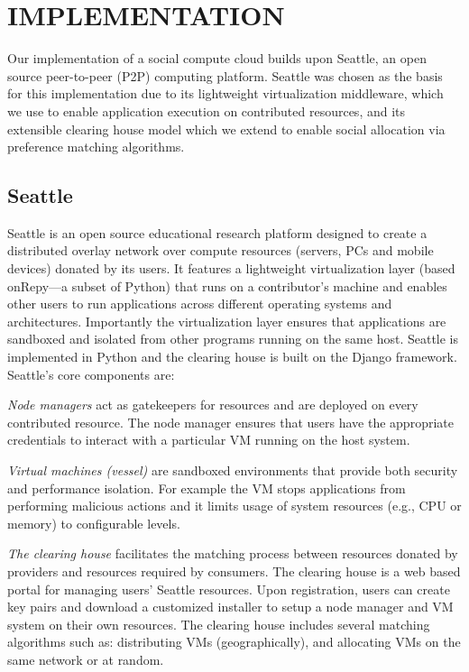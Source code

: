 \documentclass[a4paper,12pt]{article}
\begin{document}
	\section{IMPLEMENTATION}
Our implementation of a social compute cloud builds upon
Seattle, an open source peer-to-peer (P2P) computing platform. Seattle was chosen as the basis for this implementation due to its lightweight virtualization middleware, which
we use to enable application execution on contributed
resources, and its extensible clearing house model which
we extend to enable social allocation via preference matching algorithms.
	\subsection{Seattle}
Seattle is an open source educational research platform
designed to create a distributed overlay network over compute resources (servers, PCs and mobile devices) donated
by its users. It features a lightweight virtualization layer (based onRepy—a subset of Python) that runs on a contributor’s machine and enables other users to run applications
across different operating systems and architectures. Importantly the virtualization layer ensures that applications are
sandboxed and isolated from other programs running on
the same host. Seattle is implemented in Python and the
clearing house is built on the Django framework. Seattle’s
core components are:
	\par \textit{Node managers} act as gatekeepers for resources and are
deployed on every contributed resource. The node manager
ensures that users have the appropriate credentials to interact with a particular VM running on the host system.
	\par \textit{Virtual machines (vessel)} are sandboxed environments that
provide both security and performance isolation. For example the VM stops applications from performing malicious
actions and it limits usage of system resources (e.g., CPU or
memory) to configurable levels.
	\par \textit{The clearing house} facilitates the matching process
between resources donated by providers and resources
required by consumers. The clearing house is a web based
portal for managing users’ Seattle resources. Upon registration, users can create key pairs and download a customized
installer to setup a node manager and VM system on their
own resources. The clearing house includes several matching algorithms such as: distributing VMs (geographically),
and allocating VMs on the same network or at random.
\end{document}
